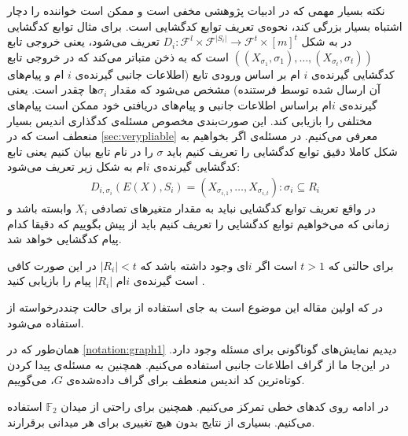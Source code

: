 \begin{remark}
	\label{remark:pliablevsvery}
	نکته بسیار مهمی که در ادبیات پژوهشی 
	\picod
	مخفی است و ممکن است خواننده را دچار اشتباه بسیار بزرگی کند، نحوه‌ی تعریف توابع کدگشایی است. برای مثال توابع کدگشایی در
	\cite{song2017polynomialtime}
	به شکل
	$D_i: \mathcal{F}^l \times \mathcal{F}^{|S_i|} \rightarrow \mathcal{F}^t \times [m]^t$
	تعریف می‌شود، یعنی خروجی تابع
	$((X_{\sigma_1}, \sigma_1), \ldots, (X_{\sigma_t}, \sigma_t) )$
	است که به ذخن متباتر می‌کند که در خروجی تابع کدگشایی گیرنده‌ی 
	$i$
	ام بر اساس ورودی تابع (اطلاعات جانبی گیرنده‌ی 
	$i$
	ام و پیام‌های آن ارسال شده توسط فرستنده) مشخص می‌شود که مقدار
	$\sigma_i$ها 
 چقدر است. یعنی گیرنده‌ی
	$i$ام
	 براساس اطلاعات جانبی و پیام‌های دریافتی خود ممکن است پیام‌های مختلفی را بازیابی کند. این صورت‌بندی مخصوص مسئله‌ی کدگذاری اندیس بسیار منعطف است که در
	\autoref{sec:verypliable}
	معرفی می‌کنیم. در مسئله‌ی
	\picod
	اگر بخواهیم به شکل کاملا دقیق توابع کدگشایی را تعریف کنیم باید 
	$\sigma$
	 را در نام تابع بیان کنیم یعنی تابع کدگشایی گیرنده‌ی
	 $i$ام
    به شکل زیر تعریف می‌شود:
	 	\begin{align}
	 	D_{i, \sigma_i}(E(X), S_i) = (X_{\sigma_{i,1}}, \ldots, X_{\sigma_{i,t}}): \sigma_i \subseteq R_i
	 	\end{align}
	 	در واقع تعریف توابع کدگشایی نباید به مقدار متغیرهای تصادفی
	 	$X_i$
	 	وابسته باشد و زمانی که می‌خواهیم توابع کدگشایی را تعریف کنیم باید از پیش بگوییم که دقیقا کدام پیام کدگشایی خواهد شد.
\end{remark}

\begin{note}
	برای حالتی که
	$t > 1$
	است اگر
	$i$ای وجود داشته باشد که
	$|R_i| < t$
	در این صورت کافی است گیرنده‌ی 
	$i$ام
	$|R_i|$
	پیام را بازیابی کنید \cite{pliablefirstpaper}.
\end{note}

\begin{note}
	در 
	\cite{pliablefirstpaper}
	که اولین مقاله این موضوع است به جای استفاده از
	\picodt
	برای حالت چنددرخواسته از
	استفاده می‌شود.
\end{note}
\begin{notation}
	همان‌طور که در
	\autoref{notation:graph1}
	دیدیم نمایش‌های گوناگونی برای مسئله وجود دارد. در این‌جا ما از گراف اطلاعات جانبی استفاده می‌کنیم. همچنین به مسئله‌ی پیدا کردن کوتاه‌ترین کد اندیس منعطف برای گراف داده‌شده‌ی 
	$G$،
	\picodg
	می‌گوییم.
\end{notation}


در ادامه روی کدهای خطی تمرکز می‌کنیم. همچنین برای راحتی از میدان
$\mathbb{F}_2$
استفاده می‌کنیم. بسیاری از نتایج بدون هیچ تغییری برای هر میدانی برقرارند.

